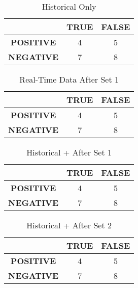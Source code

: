 \documentclass[paper=a4, fontsize=10pt]{scrartcl} %
\numberwithin{equation}{section} %
\numberwithin{figure}{section} %
\numberwithin{table}{section} %
\begin{document}
\begin{table}[h]
\caption{Historical Only}
\label{tab:h1}
\begin{tabular}{ c | c | c}
    \hline
    & \textbf{TRUE} & \textbf{FALSE}  \\ \hline
   \textbf{POSITIVE} &  4 & 5  \\ \hline
   \textbf{NEGATIVE} & 7 & 8  \\ \hline
\end{tabular}
\end{table}
\begin{table}[h]
\caption{Real-Time Data After Set 1}
\label{tab:h2}
\begin{tabular}{ c | c | c}
    \hline
    & \textbf{TRUE} & \textbf{FALSE}  \\ \hline
   \textbf{POSITIVE} &  4 & 5  \\ \hline
   \textbf{NEGATIVE} & 7 & 8  \\ \hline
\end{tabular}
\end{table}
\begin{table}[h]
\caption{Historical + After Set 1}
\label{tab:h3}
\begin{tabular}{ c | c | c}
    \hline
    & \textbf{TRUE} & \textbf{FALSE}  \\ \hline
   \textbf{POSITIVE} &  4 & 5  \\ \hline
   \textbf{NEGATIVE} & 7 & 8  \\ \hline
\end{tabular}
\end{table}
\begin{table}[h]
\caption{Historical + After Set 2}
\label{tab:h4}
\begin{tabular}{ c | c | c}
    \hline
    & \textbf{TRUE} & \textbf{FALSE}  \\ \hline
   \textbf{POSITIVE} &  4 & 5  \\ \hline
   \textbf{NEGATIVE} & 7 & 8  \\ \hline
\end{tabular}
\end{table}
\end{document}
